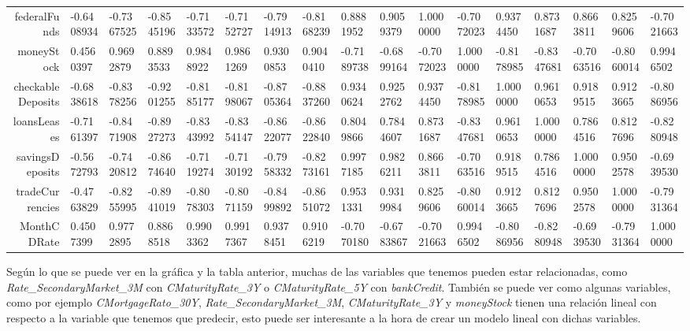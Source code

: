 \documentclass[11pt]{article}
\begin{document}
\begin{tabular}{r|llllllllllllllll}
	federalFunds & -0.6408934 & -0.7367525 & -0.8545196 & -0.7133572 & -0.7152727 & -0.7914913 & -0.8168239 &  0.8881952 &  0.9059379 &  1.0000000 & -0.7072023 &  0.9374450 &  0.8731687 &  0.8663811 &  0.8259606 & -0.7021663\\
	moneyStock &  0.4560397 &  0.9692879 &  0.8893533 &  0.9848922 &  0.9861269 &  0.9300853 &  0.9040410 & -0.7189738 & -0.6899164 & -0.7072023 &  1.0000000 & -0.8178985 & -0.8347681 & -0.7063516 & -0.8060014 &  0.9946502\\
	checkableDeposits & -0.6838618 & -0.8378256 & -0.9201255 & -0.8185177 & -0.8198067 & -0.8705364 & -0.8837260 &  0.9340624 &  0.9252762 &  0.9374450 & -0.8178985 &  1.0000000 &  0.9610653 &  0.9189515 &  0.9123665 & -0.8086956\\
	loansLeases & -0.7161397 & -0.8471908 & -0.8927273 & -0.8343992 & -0.8354147 & -0.8622077 & -0.8622840 &  0.8049866 &  0.7844607 &  0.8731687 & -0.8347681 &  0.9610653 &  1.0000000 &  0.7864516 &  0.8127696 & -0.8280948\\
	savingsDeposits & -0.5672793 & -0.7420812 & -0.8674640 & -0.7119274 & -0.7130192 & -0.7958332 & -0.8273161 &  0.9977185 &  0.9826211 &  0.8663811 & -0.7063516 &  0.9189515 &  0.7864516 &  1.0000000 &  0.9502578 & -0.6939530\\
	tradeCurrencies & -0.4763829 & -0.8255995 & -0.8941019 & -0.8078303 & -0.8071159 & -0.8499892 & -0.8651072 &  0.9531331 &  0.9319984 &  0.8259606 & -0.8060014 &  0.9123665 &  0.8127696 &  0.9502578 &  1.0000000 & -0.7931364\\
	MonthCDRate &  0.4507399 &  0.9772895 &  0.8868518 &  0.9903362 &  0.9917367 &  0.9378451 &  0.9106219 & -0.7070180 & -0.6783867 & -0.7021663 &  0.9946502 & -0.8086956 & -0.8280948 & -0.6939530 & -0.7931364 &  1.0000000\\
\end{tabular}


    
    Según lo que se puede ver en la gráfica y la tabla anterior, muchas de
las variables que tenemos pueden estar relacionadas, como
\emph{Rate\_SecondaryMarket\_3M} con \emph{CMaturityRate\_3Y} o
\emph{CMaturityRate\_5Y} con \emph{bankCredit}. También se puede ver
como algunas variables, como por ejemplo \emph{CMortgageRato\_30Y},
\emph{Rate\_SecondaryMarket\_3M}, \emph{CMaturityRate\_3Y} y
\emph{moneyStock} tienen una relación lineal con respecto a la variable
que tenemos que predecir, esto puede ser interesante a la hora de crear
un modelo lineal con dichas variables.


    
    
    
    
\end{document}
